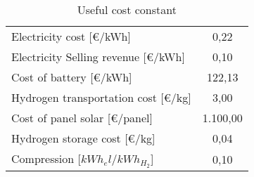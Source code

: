 \begin{table}[hb!]
\centering
\begin{tabular}{|lc|}
\hline
\rowcolor{bluepoli!40}\multicolumn{2}{|c|}{\textbf{Constant}}                             \\ \hline
\multicolumn{1}{|l|}{Electricity cost {[}€/kWh{]}}              & 0,22                    \\ \hline
\multicolumn{1}{|l|}{Electricity Selling revenue {[}€/kWh{]}}   & 0,10                    \\ \hline
\multicolumn{1}{|l|}{Cost of battery {[}€/kWh{]}}               & 122,13                  \\ \hline
\multicolumn{1}{|l|}{Hydrogen transportation cost {[}€/kg{]}}   & 3,00                    \\ \hline
\multicolumn{1}{|l|}{Cost of panel solar {[}€/panel{]}}         & 1.100,00                \\ \hline
\multicolumn{1}{|l|}{Hydrogen storage cost {[}€/kg{]}}          & 0,04                    \\ \hline
\multicolumn{1}{|l|}{Compression {[}$kWh_el$/$kWh_{H_2}${]}}    & 0,10                    \\ \hline
\end{tabular}
\caption{Useful cost constant\textsuperscript{\cite{ARERA2020,enelx, pianoidrogeno}}}
\label{tab:costconstant}
\end{table}